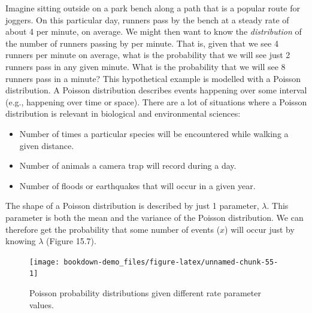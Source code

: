 \documentclass[
  openany]{krantz}
\providecommand{\tightlist}{%
  \setlength{\itemsep}{0pt}\setlength{\parskip}{0pt}}
\begin{document}
Imagine sitting outside on a park bench along a path that is a popular route for joggers.
On this particular day, runners pass by the bench at a steady rate of about 4 per minute, on average.
We might then want to know the \emph{distribution} of the number of runners passing by per minute.
That is, given that we see 4 runners per minute on average, what is the probability that we will see just 2 runners pass in any given minute.
What is the probability that we will see 8 runners pass in a minute?
This hypothetical example is modelled with a Poisson distribution.
A Poisson distribution describes events happening over some interval (e.g., happening over time or space).
There are a lot of situations where a Poisson distribution is relevant in biological and environmental sciences:

\begin{itemize}
\tightlist
\item
  Number of times a particular species will be encountered while walking a given distance.
\item
  Number of animals a camera trap will record during a day.
\item
  Number of floods or earthquakes that will occur in a given year.
\end{itemize}

The shape of a Poisson distribution is described by just 1 parameter, \(\lambda\).
This parameter is both the mean and the variance of the Poisson distribution.
We can therefore get the probability that some number of events (\(x\)) will occur just by knowing \(\lambda\) (Figure 15.7).

\begin{figure}
\texttt{[image: bookdown-demo\_files/figure-latex/unnamed-chunk-55-1]} \caption{Poisson probability distributions given different rate parameter values.}\label{fig:unnamed-chunk-55}
\end{figure}
\end{document}
